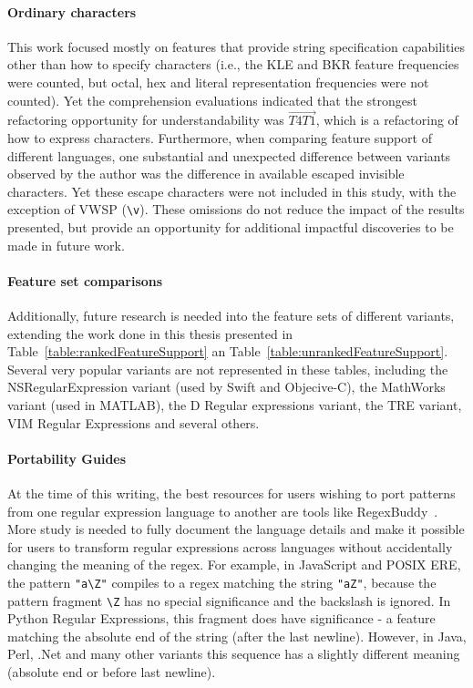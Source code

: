 \paragraph{Ordinary characters}  This work focused mostly on features that provide string specification capabilities other than how to specify characters (i.e., the KLE and BKR feature frequencies were counted, but octal, hex and literal representation frequencies were not counted).  Yet the comprehension evaluations indicated that the strongest refactoring opportunity for understandability was $\overrightarrow{T4 T1}$, which is a refactoring of how to express characters.  Furthermore, when comparing feature support of different languages, one substantial and unexpected difference between variants observed by the author was the difference in available escaped invisible characters.  Yet these escape characters were not included in this study, with the exception of VWSP (\verb!\v!).  These omissions do not reduce the impact of the results presented, but provide an opportunity for additional impactful discoveries to be made in future work.

\paragraph{Feature set comparisons} Additionally, future research is needed into the feature sets of different variants, extending the work done in this thesis presented in Table~\ref{table:rankedFeatureSupport} an Table~\ref{table:unrankedFeatureSupport}.  Several very popular variants are not represented in these tables, including the NSRegularExpression variant (used by Swift and Objecive-C), the MathWorks variant (used in MATLAB), the D Regular expressions variant, the TRE variant, VIM Regular Expressions and several others.

\paragraph{Portability Guides} At the time of this writing, the best resources for users wishing to port patterns from one regular expression language to another are tools like RegexBuddy~\citep{RegexBuddy}.  More study is needed to fully document the language details and make it possible for users to transform regular expressions across languages without accidentally changing the meaning of the regex.  For example, in JavaScript and POSIX ERE, the pattern \verb!"a\Z"! compiles to a regex matching the string \verb!"aZ"!, because the pattern fragment \verb!\Z! has no special significance and the backslash is ignored.  In Python Regular Expressions, this fragment does have significance - a feature matching the absolute end of the string (after the last newline).  However, in Java, Perl, .Net and many other variants this sequence has a slightly different meaning (absolute end or before last newline).

